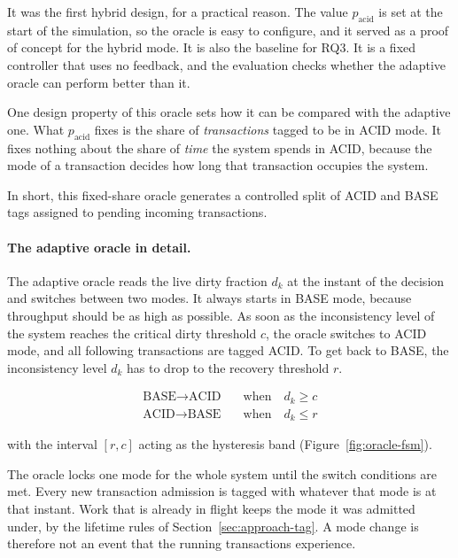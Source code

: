 It was the first hybrid design, for a practical reason. The value
$p_{\mathrm{acid}}$ is set at the start of the simulation, so the oracle is easy
to configure, and it served as a proof of concept for the hybrid mode. It is
also the baseline for RQ3. It is a fixed controller that uses no feedback, and
the evaluation checks whether the adaptive oracle can perform better than it.

One design property of this oracle sets how it can be compared with the adaptive
one. What $p_{\mathrm{acid}}$ fixes is the share of \emph{transactions} tagged
to be in ACID mode. It fixes nothing about the share of \emph{time} the system
spends in ACID, because the mode of a transaction decides how long that
transaction occupies the system.

In short, this fixed-share oracle generates a controlled split of ACID and BASE
tags assigned to pending incoming transactions.

\paragraph{The adaptive oracle in detail.}\label{sec:approach-adaptive-oracle} The
adaptive oracle reads the live dirty fraction $d_k$ at the instant of the decision
and switches between two modes. It always starts in BASE mode, because throughput
should be as high as possible. As soon as the inconsistency level of the system
reaches the critical dirty threshold $c$, the oracle switches to ACID mode, and
all following transactions are tagged ACID. To get back to BASE, the
inconsistency level $d_k$ has to drop to the recovery threshold $r$.

\begin{align}
  \text{BASE} \rightarrow \text{ACID} \quad & \text{when} \quad d_k \ge c
  \label{eq:enter-acid}                                                   \\
  \text{ACID} \rightarrow \text{BASE} \quad & \text{when} \quad d_k \le r
  \label{eq:leave-acid}
\end{align}

with the interval $[r, c]$ acting as the hysteresis band
(Figure~\ref{fig:oracle-fsm}).

The oracle locks one mode for the whole system until the switch conditions are
met. Every new transaction admission is tagged with whatever that mode is at that
instant. Work that is already in flight keeps the mode it was admitted under, by
the lifetime rules of Section~\ref{sec:approach-tag}. A mode change is therefore
not an event that the running transactions experience.

